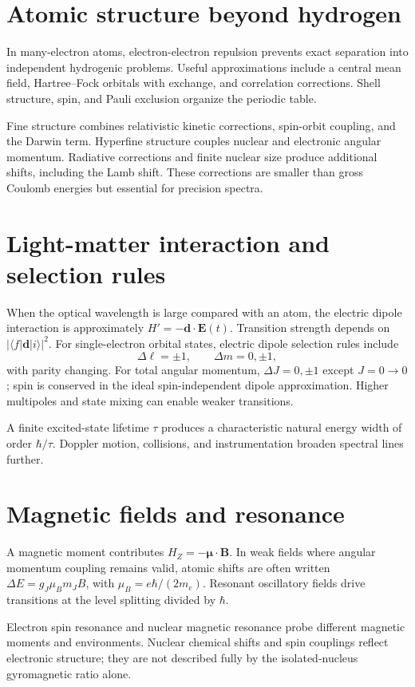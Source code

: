 \documentclass[11pt,oneside]{book}
\newcommand{\vect}[1]{\boldsymbol{#1}}
\newcommand{\ket}[1]{\lvert #1\rangle}
\newcommand{\bra}[1]{\langle #1\rvert}
\theoremstyle{reviewstyle}
\begin{document}
\section{Atomic structure beyond hydrogen}
In many-electron atoms, electron-electron repulsion prevents exact separation into independent hydrogenic problems. Useful approximations include a central mean field, Hartree--Fock orbitals with exchange, and correlation corrections. Shell structure, spin, and Pauli exclusion organize the periodic table.

Fine structure combines relativistic kinetic corrections, spin-orbit coupling, and the Darwin term. Hyperfine structure couples nuclear and electronic angular momentum. Radiative corrections and finite nuclear size produce additional shifts, including the Lamb shift. These corrections are smaller than gross Coulomb energies but essential for precision spectra.
\section{Light-matter interaction and selection rules}
When the optical wavelength is large compared with an atom, the electric dipole interaction is approximately $H'=-\vect d\cdot\vect E(t)$. Transition strength depends on $|\bra f\vect d\ket i|^2$. For single-electron orbital states, electric dipole selection rules include
\begin{equation}\Delta\ell=\pm1,\qquad \Delta m=0,\pm1,\end{equation}
with parity changing. For total angular momentum, $\Delta J=0,\pm1$ except $J=0\to0$; spin is conserved in the ideal spin-independent dipole approximation. Higher multipoles and state mixing can enable weaker transitions.

A finite excited-state lifetime $\tau$ produces a characteristic natural energy width of order $\hbar/\tau$. Doppler motion, collisions, and instrumentation broaden spectral lines further.
\section{Magnetic fields and resonance}
A magnetic moment contributes $H_Z=-\vect\mu\cdot\vect B$. In weak fields where angular momentum coupling remains valid, atomic shifts are often written $\Delta E=g_J\mu_Bm_JB$, with $\mu_B=e\hbar/(2m_e)$. Resonant oscillatory fields drive transitions at the level splitting divided by $\hbar$.

Electron spin resonance and nuclear magnetic resonance probe different magnetic moments and environments. Nuclear chemical shifts and spin couplings reflect electronic structure; they are not described fully by the isolated-nucleus gyromagnetic ratio alone.
\end{document}
